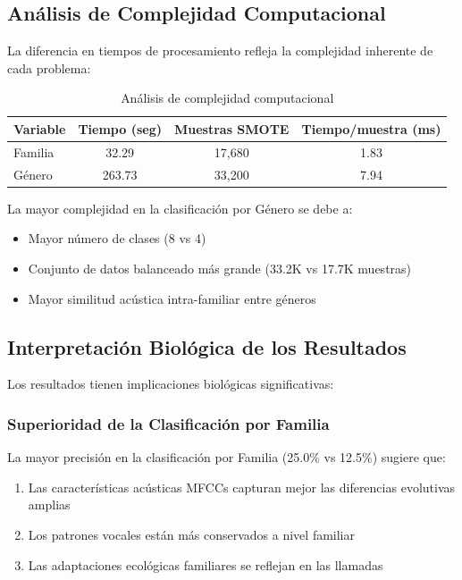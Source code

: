 \documentclass[12pt,a4paper]{article}
\begin{document}
\subsection{Análisis de Complejidad Computacional}
La diferencia en tiempos de procesamiento refleja la complejidad inherente de cada problema:

\begin{table}[H]
\centering
\begin{tabular}{|l|c|c|c|}
\hline
\textbf{Variable} & \textbf{Tiempo (seg)} & \textbf{Muestras SMOTE} & \textbf{Tiempo/muestra (ms)} \\
\hline
Familia & 32.29 & 17,680 & 1.83 \\
Género & 263.73 & 33,200 & 7.94 \\
\hline
\end{tabular}
\caption{Análisis de complejidad computacional}
\end{table}

La mayor complejidad en la clasificación por Género se debe a:
\begin{itemize}
    \item Mayor número de clases (8 vs 4)
    \item Conjunto de datos balanceado más grande (33.2K vs 17.7K muestras)
    \item Mayor similitud acústica intra-familiar entre géneros
\end{itemize}

\subsection{Interpretación Biológica de los Resultados}
Los resultados tienen implicaciones biológicas significativas:

\subsubsection{Superioridad de la Clasificación por Familia}
La mayor precisión en la clasificación por Familia (25.0\% vs 12.5\%) sugiere que:
\begin{enumerate}
    \item Las características acústicas MFCCs capturan mejor las diferencias evolutivas amplias
    \item Los patrones vocales están más conservados a nivel familiar
    \item Las adaptaciones ecológicas familiares se reflejan en las llamadas
\end{enumerate}
\end{document}
